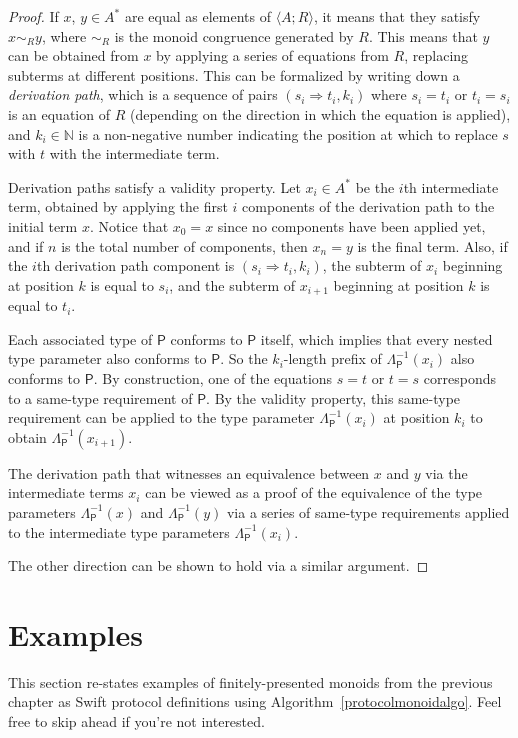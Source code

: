 \documentclass[headsepline,bibliography=totoc]{scrreport}
\newcommand{\proto}[1]{\bm{\mathsf{#1}}}
\theoremstyle{definition}
\theoremstyle{definition}
\theoremstyle{definition}
\begin{document}
\begin{proof}
If $x$, $y\in A^*$ are equal as elements of $\langle A;R\rangle$, it means that they satisfy $x\sim_R y$, where $\sim_R$ is the monoid congruence generated by $R$. This means that $y$ can be obtained from $x$ by applying a series of equations from $R$, replacing subterms at different positions.
This can be formalized by writing down a \emph{derivation path}, which is a sequence of pairs $(s_i \Rightarrow t_i, k_i)$ where $s_i=t_i$ or $t_i=s_i$ is an equation of $R$ (depending on the direction in which the equation is applied), and $k_i\in\mathbb{N}$ is a non-negative number indicating the position at which to replace $s$ with $t$ with the intermediate term.

Derivation paths satisfy a validity property. Let $x_i\in A^*$ be the $i$th intermediate term, obtained by applying the first $i$ components of the derivation path to the initial term $x$. Notice that $x_0=x$ since no components have been applied yet, and if $n$ is the total number of components, then $x_n=y$ is the final term. Also, if the $i$th derivation path component is $(s_i\Rightarrow t_i, k_i)$, the subterm of $x_i$ beginning at position $k$ is equal to $s_i$, and the subterm of $x_{i+1}$ beginning at position $k$ is equal to $t_i$.

Each associated type of $\proto{P}$ conforms to $\proto{P}$ itself, which implies that every nested type parameter also conforms to $\proto{P}$. So the $k_i$-length prefix of $\Lambda_{\proto{P}}^{-1}(x_i)$ also conforms to $\proto{P}$. By construction, one of the equations $s=t$ or $t=s$ corresponds to a same-type requirement of $\proto{P}$. By the validity property, this same-type requirement can be applied to the type parameter $\Lambda_{\proto{P}}^{-1}(x_i)$ at position $k_i$ to obtain $\Lambda_{\proto{P}}^{-1}(x_{i+1})$.

The derivation path that witnesses an equivalence between $x$ and $y$ via the intermediate terms $x_i$ can be viewed as a proof of the equivalence of the type parameters $\Lambda_{\proto{P}}^{-1}(x)$ and $\Lambda_{\proto{P}}^{-1}(y)$ via a series of same-type requirements applied to the intermediate type parameters $\Lambda_{\proto{P}}^{-1}(x_i)$.

The other direction can be shown to hold via a similar argument.
\end{proof}
\section{Examples}
This section re-states examples of finitely-presented monoids from the previous chapter as Swift protocol definitions using Algorithm~\ref{protocolmonoidalgo}. Feel free to skip ahead if you're not interested.
\end{document}
